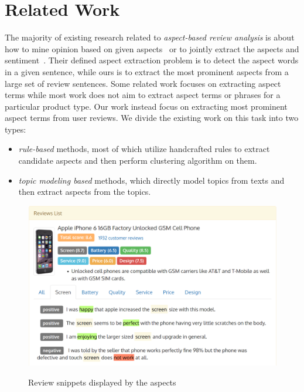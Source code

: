 \section{Related Work}
\label{sec:related}
The majority of existing research related to \textit{aspect-based review analysis} is about how to mine opinion based on given aspects~\cite{su2008hidden,zeng2013classification} or to jointly extract the aspects and sentiment~\cite{lin2009joint,qiu2011opinion,liu2016improving}. 
Their defined aspect extraction problem is to detect the aspect words in a given sentence, while ours is to extract the most prominent aspects from a large set of review sentences.
Some related work focuses on extracting aspect terms while most work does not aim to extract aspect terms or phrases for a particular product type.
Our work instead focus on extracting most prominent aspect terms from user reviews. 
We divide the existing work on this task into two types:
\begin{itemize}
	\item \textit{rule-based} methods, most of which utilize handcrafted rules to extract candidate aspects
	and then perform clustering algorithm on them.
	\item \textit{topic modeling based} methods, which directly model topics from texts and then extract aspects from 
	the topics.
\end{itemize}
\begin{figure}[h!]
	\centering 
	{\includegraphics[width=1.5\columnwidth]{figures/sentimentexample.png}}
	\caption{Review snippets displayed by the aspects\label{fig:experiments:sentimentexample}}
\end{figure}
